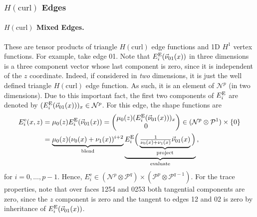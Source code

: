 \subsubsection{\texorpdfstring{$H(\mathrm{curl})$}{Hcurl} Edges}

\paragraph{\texorpdfstring{$H(\mathrm{curl})$}{Hcurl} Mixed Edges.} 
These are tensor products of triangle $H(\text{curl})$ edge functions and 1D $H^1$ vertex functions.
For example, take edge 01. 
Note that $E_i^{\mathrm{E}}(\vec{\nu}_{01}(x))$ in three dimensions is a three component vector whose last component is zero, since it is independent of the $z$ coordinate. 
Indeed, if considered in \textit{two} dimensions, it is just the well defined triangle $H(\text{curl})$ edge function. 
As such, it is an element of $\mathcal{N}^p$ (in two dimensions). 
Due to this important fact, the first two components of $E_i^{\mathrm{E}}$ are denoted by $(E_i^{\mathrm{E}}(\vec{\nu}_{01}(x)))_x\in\mathcal{N}^p$. 
For this edge, the shape functions are
\begin{equation*}
	\begin{aligned}
		E_i^\mathrm{e}(x,z)&=\mu_0(z)E_i^{\mathrm{E}}(\vec{\nu}_{01}(x))
				=\begin{pmatrix}\mu_0(z)(E_i^{\mathrm{E}}(\vec{\nu}_{01}(x)))_x\\0\end{pmatrix}
					\in(\mathcal{N}^p\otimes\mathcal{P}^1)\times\{0\}\\
		  &=\underbrace{\mu_0(z)(\nu_0(x)+\nu_1(x))^{i+2}}_{\text{blend}}
    		\underbrace{E_i^{\mathrm{E}}\Big(\underbrace{\textstyle{\frac{1}{\nu_0(x)+\nu_1(x)}\vec{\nu}_{01}(x)}}_{\text{project}}
    			\Big)}_{\text{evaluate}}\,,
	\end{aligned}
\end{equation*}
for $i=0,\ldots,p-1$.
Hence, $E_i^\mathrm{e}\in(\mathcal{N}^p\otimes\mathcal{P}^q)\times(\mathcal{P}^p\otimes\mathcal{P}^{q-1})$.
For the trace properties, note that over faces 1254 and 0253 both tangential components are zero, since the $z$ component is zero and the tangent to edges 12 and 02 is zero by inheritance of $E_i^{\mathrm{E}}(\vec{\nu}_{01}(x))$.
